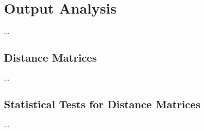 \section{Output Analysis}

...



\subsection{Distance Matrices}


...


\subsection{Statistical Tests for Distance Matrices}

...




